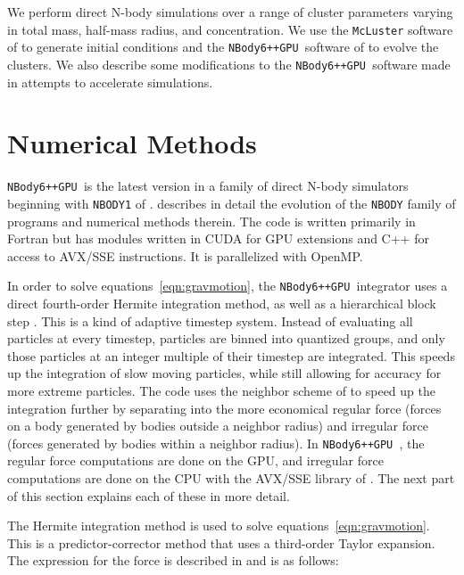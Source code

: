 \documentclass{princeton_astro_thesis}
\newcommand\nbody{\texttt{NBody6++GPU }}
\numberwithin{equation}{section}
\begin{document}
We perform direct N-body simulations over a range of cluster parameters varying in total mass, half-mass radius, and concentration.  We use the \texttt{McLuster} software of \citet{2011Kupper} to generate initial conditions and the \nbody software of \citet{2015Wang} to evolve the clusters. We also describe some modifications to the \nbody software made in attempts to accelerate simulations.

\section{Numerical Methods}
\nbody is the latest version in a family of direct N-body simulators beginning with \texttt{NBODY1} of \citet{1963Aarseth}. \citet{1999Aarseth} describes in detail the evolution of the \texttt{NBODY} family of programs and numerical methods therein.  The code is written primarily in Fortran but has modules written in CUDA for GPU extensions and C++ for access to AVX/SSE instructions. It is parallelized with OpenMP.

In order to solve equations~\ref{eqn:gravmotion}, the \nbody integrator uses a direct fourth-order Hermite integration method, as well as a hierarchical block step \citep[][and refs within]{2015Wang}. This is a kind of adaptive timestep system. Instead of evaluating all particles at every timestep, particles are binned into quantized groups, and only those particles at an integer multiple of their timestep are integrated. This speeds up the integration of slow moving particles, while still allowing for accuracy for more extreme particles. The code uses the neighbor scheme of \citet{1973Ahmad} to speed up the integration further by separating into the more economical regular force (forces on a body generated by bodies outside a neighbor radius) and irregular force (forces generated by bodies within a neighbor radius). In \nbody, the regular force computations are done on the GPU, and irregular force computations are done on the CPU with the AVX/SSE library of \citet{2012Nitadori}. The next part of this section explains each of these in more detail.

The Hermite integration method is used to solve equations~\ref{eqn:gravmotion}.  This is a predictor-corrector method that uses a third-order Taylor expansion.  The expression for the force is described in \citet{1999Aarseth} and is as follows:
\end{document}
